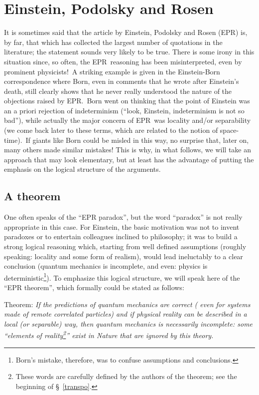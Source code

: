 \documentclass[12pt,onecolumn]{article}%
\begin{document}
\section{Einstein, Podolsky and Rosen}

It is sometimes said that the article by Einstein, Podolsky and Rosen (EPR)
\cite{EPR} is, by far, that which has collected the largest number of
quotations in the literature; the statement sounds very likely to be true.
There is some irony in this situation since, so often, the EPR\ reasoning has
been misinterpreted, even by prominent physicists!\ A striking example is
given in the Einstein-Born correspondence \cite{Einstein-Born} where Born,
even in comments that he wrote after Einstein's death, still clearly shows
that he never really understood the nature of the objections raised by
EPR.\ Born went on thinking that the point of Einstein was an a priori
rejection of indeterminism (``look, Einstein, indeterminism is not so bad''),
while actually the major concern of EPR\ was locality and/or separability (we
come back later to these terms, which are related to the notion of
space-time).\ If giants like Born could be misled in this way, no surprise
that, later on, many others made similar mistakes! This is why, in what
follows, we will take an approach that may look elementary, but at least has
the advantage of putting the emphasis on the logical structure of the arguments.

\subsection{A theorem}

One often speaks of the ``EPR paradox'', but the word ``paradox'' is not
really appropriate in this case. For Einstein, the basic motivation was not to
invent paradoxes or to entertain colleagues inclined to philosophy; it was to
build a strong logical reasoning which, starting from well defined assumptions
(roughly speaking: locality and some form of realism), would lead ineluctably
to a clear conclusion (quantum mechanics is incomplete, and even: physics is
deterministic\footnote{Born's mistake, therefore, was to confuse assumptions
and conclusions.}). To emphasize this logical structure, we will speak here of
the ``EPR theorem'', which formally could be stated as follows:

Theorem: \textit{If the predictions of quantum mechanics are correct ( even
for systems made of remote correlated particles) and if physical reality can
be described in a local (or separable) way, then quantum mechanics is
necessarily incomplete: some ``elements of reality\footnote{These words are
carefully defined by the authors of the theorem; see the beginning of
\S \ \ref{transpo}.}'' exist in Nature that are ignored by this theory.}
\end{document}
